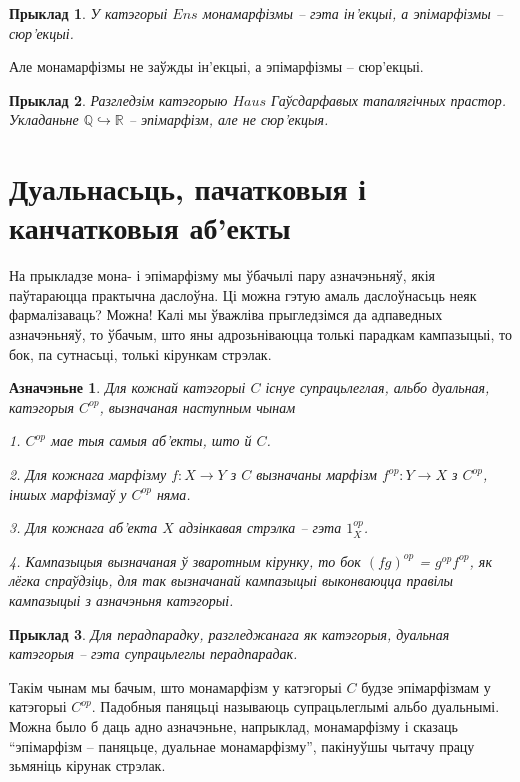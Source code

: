 \documentclass[a4paper,12pt]{book}
\newtheorem{example}{Прыклад}[section]
\newtheorem{definition}{Азначэньне}[section]
\begin{document}
\begin{example}
  У катэгорыі $Ens$ монамарфізмы -- гэта ін'екцыі, а эпімарфізмы --
  сюр'екцыі.
\end{example}

Але монамарфізмы не заўжды ін'екцыі, а эпімарфізмы -- сюр'екцыі.

\begin{example}
  Разгледзім катэгорыю $Haus$ Гаўсдарфавых тапалягічных
  прастор. Укладаньне $\mathbb{Q} \hookrightarrow \mathbb{R}$ --
  эпімарфізм, але не сюр'екцыя.
\end{example}

\section{Дуальнасьць, пачатковыя і канчатковыя аб'екты}

На прыкладзе мона- і эпімарфізму мы ўбачылі пару азначэньняў, якія
паўтараюцца практычна даслоўна. Ці можна гэтую амаль даслоўнасьць неяк
фармалізаваць? Можна! Калі мы ўважліва прыгледзімся да адпаведных
азначэньняў, то ўбачым, што яны адрозьніваюцца толькі парадкам
кампазыцыі, то бок, па сутнасьці, толькі кірункам стрэлак.

\begin{definition}
  Для кожнай катэгорыі $C$ існуе супрацьлеглая, альбо дуальная,
  катэгорыя $C^{op}$, вызначаная наступным чынам

  1. $C^{op}$ мае тыя самыя аб'екты, што й $C$.

  2. Для кожнага марфізму $f: X \rightarrow Y$ з $C$ вызначаны марфізм
  $f^{op}: Y \rightarrow X$ з $C^{op}$, іншых марфізмаў у $C^{op}$ няма.

  3. Для кожнага аб'екта $X$ адзінкавая стрэлка -- гэта $1_X^{op}$.

  4. Кампазыцыя вызначаная ў зваротным кірунку, то бок $(fg)^{op}$ =
  $g^{op}f^{op}$, як лёгка спраўдзіць, для так вызначанай кампазыцыі
  выконваюцца правілы кампазыцыі з азначэньня катэгорыі.
\end{definition}

\begin{example}
  Для перадпарадку, разгледжанага як катэгорыя, дуальная катэгорыя --
  гэта супрацьлеглы перадпарадак.
\end{example}

Такім чынам мы бачым, што монамарфізм у катэгорыі $C$ будзе
эпімарфізмам у катэгорыі $C^{op}$. Падобныя паняцьці называюць
супрацьлеглымі альбо дуальнымі. Можна было б даць адно азначэньне,
напрыклад, монамарфізму і сказаць ``эпімарфізм -- паняцьце, дуальнае
монамарфізму'', пакінуўшы чытачу працу зьмяніць кірунак стрэлак.
\end{document}
